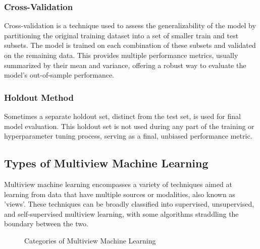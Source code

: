 \subsubsection{Cross-Validation}

Cross-validation is a technique used to assess the generalizability of the model by partitioning the original training dataset into a set of smaller train and test subsets. The model is trained on each combination of these subsets and validated on the remaining data. This provides multiple performance metrics, usually summarized by their mean and variance, offering a robust way to evaluate the model's out-of-sample performance.

\subsubsection{Holdout Method}

Sometimes a separate holdout set, distinct from the test set, is used for final model evaluation. This holdout set is not used during any part of the training or hyperparameter tuning process, serving as a final, unbiased performance metric.

\subsection{Types of Multiview Machine Learning}

Multiview machine learning encompasses a variety of techniques aimed at learning from data that have multiple sources or modalities, also known as 'views'. These techniques can be broadly classified into supervised, unsupervised, and self-supervised multiview learning, with some algorithms straddling the boundary between the two. 

\begin{figure}
    \centering
    \caption{Categories of Multiview Machine Learning}
    \label{fig:multiview_ml}
\end{figure}

